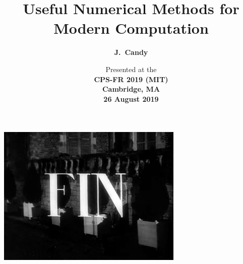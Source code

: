 \documentclass[11pt,xcolor={dvipsnames},aspectratio=169]{beamer}
\title{Useful Numerical Methods for Modern Computation}
\author{\textbf{J.~Candy}}
\date{%
  {\small Presented at the}\\
  {\bf CPS-FR 2019 (MIT)\\
    Cambridge, MA\\
    26 August 2019}}
\begin{document}
\gamaketitle
\setgabody














\begin{frame}
  \frametitle{}
  \centering
  \vspace{6mm}
  \includegraphics[width=3.5in]{figures/fin.jpg}
\end{frame}
\end{document}
